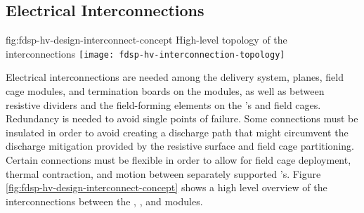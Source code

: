 

\subsection{Electrical Interconnections} %
\label{sec:fdsp-hv-design-interconnect}

\begin{dunefigure}{fig:fdsp-hv-design-interconnect-concept}
  {High-level topology of the  interconnections}
  \texttt{[image: fdsp-hv-interconnection-topology]}
\end{dunefigure}

Electrical interconnections are needed among the  delivery system,  planes, field cage modules, and termination
boards on the  modules, as well as between resistive dividers and
the field-forming elements on the 's and field cages.  Redundancy is
needed to avoid single points of failure. 
Some connections must be
insulated in order to avoid creating a discharge path that might
circumvent the discharge mitigation provided by the resistive 
surface and field cage partitioning.  Certain connections must be
flexible in order to allow for field cage deployment, thermal
contraction, and motion between separately supported 's.  Figure
\ref{fig:fdsp-hv-design-interconnect-concept} shows a high level
overview of the interconnections between the , , and  modules.


